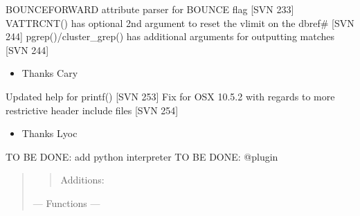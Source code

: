 \documentclass[letterpaper,10pt,english]{sphinxmanual}
\begin{document}
\sphinxAtStartPar
BOUNCEFORWARD attribute parser for BOUNCE flag {[}SVN 233{]}
VATTRCNT() has optional 2nd argument to reset the vlimit on the dbref\# {[}SVN 244{]}
pgrep()/cluster\_grep() has additional arguments for outputting matches {[}SVN 244{]}
\begin{itemize}
\item {} 
\sphinxAtStartPar
Thanks Cary

\end{itemize}

\sphinxAtStartPar
Updated help for printf() {[}SVN 253{]}
Fix for OSX 10.5.2 with regards to more restrictive header include files {[}SVN 254{]}
\begin{itemize}
\item {} 
\sphinxAtStartPar
Thanks Lyoc

\end{itemize}

\sphinxAtStartPar
TO BE DONE: add python interpreter
TO BE DONE: @plugin
\begin{quote}
\begin{quote}

\sphinxAtStartPar
Additions:
\end{quote}

\sphinxAtStartPar
— Functions —
\end{quote}
\end{document}
